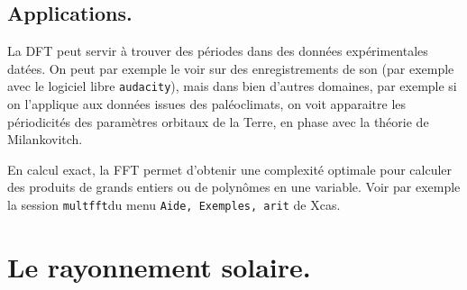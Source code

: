 \documentclass[a4paper,11pt]{article}
\begin{document}
\subsection{Applications.}
La DFT peut servir \`a trouver des p\'eriodes dans des donn\'ees
exp\'erimentales dat\'ees. On peut par exemple le voir sur
des enregistrements de son (par exemple avec le logiciel
libre \verb|audacity|), mais dans bien d'autres
domaines, par exemple si on l'applique aux donn\'ees
issues des pal\'eoclimats, on voit apparaitre les p\'eriodicit\'es
des param\`etres orbitaux de la Terre, en phase avec la th\'eorie
de Milankovitch.

En calcul exact, la FFT permet d'obtenir une complexit\'e optimale
pour calculer des produits de grands entiers ou de polyn\^omes
en une variable. Voir par exemple la session \verb|multfft|du menu 
\verb|Aide, Exemples, arit| de Xcas.


\section{Le rayonnement solaire.} \label{sec:soleil}
\end{document}
